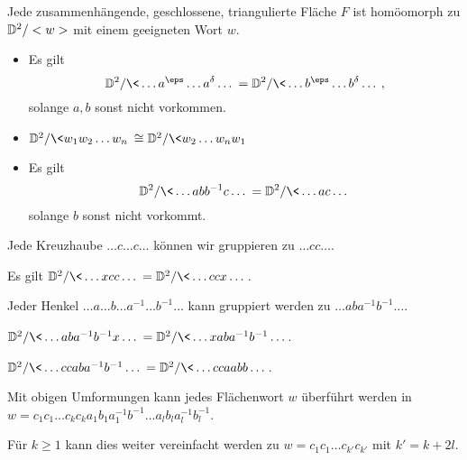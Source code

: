 \begin{lem}
	Jede zusammenhängende, geschlossene, triangulierte Fläche $F$ ist homöomorph zu $\mathbb{D}^2 / <w>$ mit einem geeigneten Wort $w$.
\end{lem}

\begin{lem}
	\begin{itemize}
		\item
			Es gilt
			\[
				\D^2 / \<\dotsc a^\eps \dotsc a^\delta \dotsc \>
				= \D^2 / \<\dotsc b^\eps \dotsc b^\delta \dotsc \>,
			\]
			solange $a, b$ sonst nicht vorkommen.
		\item
			$\D^2 / \<w_1 w_2 \dotsc w_n\> \homeomorphic \D^2 / \<w_2 \dotsc w_n w_1\>$
		\item
			Es gilt
			\[
				\D^2 / \<\dotsc abb^{-1}c \dotsc \> = \D^2 / \< \dotsc ac \dotsc \>
			\]
			solange $b$ sonst nicht vorkommt.
	\end{itemize}
\end{lem}

\begin{lem}
	Jede Kreuzhaube $\dotsc c \dotsc c \dotsc$ können wir gruppieren zu $\dotsc cc \dotsc$.
\end{lem}

\begin{lem}
	Es gilt $\D^2 / \<\dotsc xcc \dotsc \> = \D^2 / \< \dotsc ccx \dotsc \>$.
\end{lem}

\begin{lem}
	Jeder Henkel $\dotsc a  \dotsc b \dotsc a^{-1} \dotsc b^{-1} \dotsc$ kann gruppiert werden zu $\dotsc aba^{-1}b^{-1} \dotsc$.
\end{lem}

\begin{lem}
	$\D^2 / \<\dotsc aba^{-1}b^{-1}x\dotsc \> =  \D^2 / \< \dotsc x aba^{-1}b^{-1} \dotsc \>$.
\end{lem}

\begin{lem}
	$\D^2 / \<\dotsc ccaba^{-1}b^{-1}\dotsc \> =  \D^2 / \< \dotsc cc aabb \dotsc \>$.
\end{lem}

\begin{st}
	Mit obigen Umformungen kann jedes Flächenwort $w$ überführt werden in $w = c_1c_1 \dotsc c_k c_k a_1b_1a_1^{-1}b^{-1} \dotsc a_l b_l a_l^{-1} b_l^{-1}$.

	Für $k \ge 1$ kann dies weiter vereinfacht werden zu $w = c_1c_1 \dotsc c_{k'} c_{k'}$ mit $k' = k + 2l$.
\end{st}

